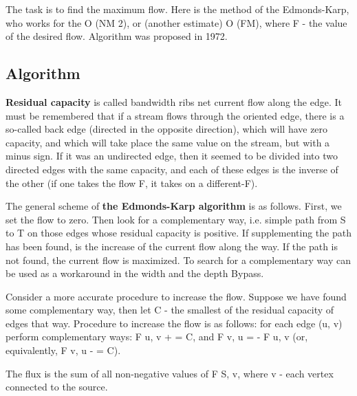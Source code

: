 The task is to find the maximum flow. Here is the method of the Edmonds-Karp, who works for the O (NM 2), or (another estimate) O (FM), where F - the value of the desired flow. Algorithm was proposed in 1972.

\subsection{ Algorithm }
\textbf{Residual capacity} is called bandwidth ribs net current flow along the edge. It must be remembered that if a stream flows through the oriented edge, there is a so-called back edge (directed in the opposite direction), which will have zero capacity, and which will take place the same value on the stream, but with a minus sign. If it was an undirected edge, then it seemed to be divided into two directed edges with the same capacity, and each of these edges is the inverse of the other (if one takes the flow F, it takes on a different-F).

The general scheme of \textbf{the Edmonds-Karp algorithm} is as follows. First, we set the flow to zero. Then look for a complementary way, i.e. simple path from S to T on those edges whose residual capacity is positive. If supplementing the path has been found, is the increase of the current flow along the way. If the path is not found, the current flow is maximized. To search for a complementary way can be used as a workaround in the width and the depth Bypass.

Consider a more accurate procedure to increase the flow. Suppose we have found some complementary way, then let C - the smallest of the residual capacity of edges that way. Procedure to increase the flow is as follows: for each edge (u, v) perform complementary ways: F u, v + = C, and F v, u = - F u, v (or, equivalently, F v, u - = C).

The flux is the sum of all non-negative values ​​of F S, v, where v - each vertex connected to the source.

